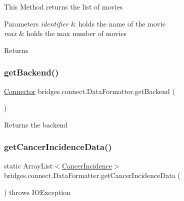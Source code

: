 This Method returns the list of movies 
\begin{DoxyParams}{Parameters}
{\em identifier} & holds the name of the movie \\
\hline
{\em max} & holds the max number of movies \\
\hline
\end{DoxyParams}
\begin{DoxyReturn}{Returns}

\end{DoxyReturn}
\mbox{\label{classbridges_1_1connect_1_1_data_formatter_a29cf4c2b0c5629d63a76b60569355c65}} 
\subsubsection{\texorpdfstring{getBackend()}{getBackend()}}
{\footnotesize\ttfamily \mbox{\hyperlink{classbridges_1_1connect_1_1_connector}{Connector}} bridges.\+connect.\+Data\+Formatter.\+get\+Backend (\begin{DoxyParamCaption}{ }\end{DoxyParamCaption})\hspace{0.3cm}{\ttfamily [protected]}}

\begin{DoxyReturn}{Returns}
the backend 
\end{DoxyReturn}
\mbox{\label{classbridges_1_1connect_1_1_data_formatter_af26cb09a93bf326fe14ad8fecf46b4f8}} 
\subsubsection{\texorpdfstring{getCancerIncidenceData()}{getCancerIncidenceData()}}
{\footnotesize\ttfamily static Array\+List$<$\mbox{\hyperlink{classbridges_1_1data__src__dependent_1_1_cancer_incidence}{Cancer\+Incidence}}$>$ bridges.\+connect.\+Data\+Formatter.\+get\+Cancer\+Incidence\+Data (\begin{DoxyParamCaption}{ }\end{DoxyParamCaption}) throws I\+O\+Exception\hspace{0.3cm}{\ttfamily [static]}}

